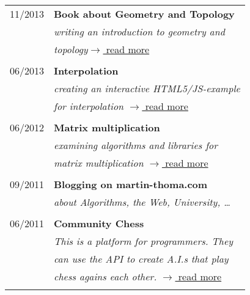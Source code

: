 \documentclass[a4paper,10pt]{article} %
\begin{document}
{\begin{minipage}[t]{0.44\textwidth}
\begin{tabular}{rl}
11/2013  & \textbf{Book about Geometry and Topology}\\
& \textit{writing an introduction to geometry and}\\
& \textit{topology}\hfill \href{http://martin-thoma.com/geotopo/}{$\rightarrow$ read more}\\ \\

06/2013	 & \textbf{Interpolation}\\
& \textit{creating an interactive HTML5/JS-example}\\
& \textit{for interpolation} \hfill \href{http://martin-thoma.com/polynomial-interpolation/}{$\rightarrow$ read more} \\\\

06/2012	 & \textbf{Matrix multiplication}\\
& \textit{examining algorithms and libraries for}\\
& \textit{matrix multiplication} \hfill \href{http://martin-thoma.com/matrix-multiplication-python-java-cpp/}{$\rightarrow$ read more}\\\\

09/2011	 & \textbf{Blogging on martin-thoma.com}\\
& \textit{about Algorithms, the Web, University, \dots}\\ \\


06/2011	 & \textbf{Community Chess}\\
& \textit{This is a platform for programmers. They}\\
& \textit{can use the API to create A.I.s that play}\\
& \textit{chess agains each other. } \hfill \href{https://github.com/MartinThoma/community-chess}{$\rightarrow$ read more}\\\\
\end{tabular}\\[10pt]


\end{minipage}}
\end{document}
